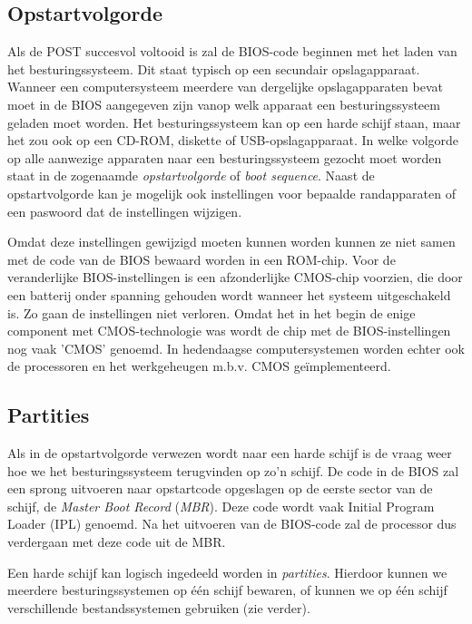 \subsection{Opstartvolgorde}

Als de POST succesvol voltooid is zal de BIOS-code beginnen met
het laden van het besturingssysteem. Dit staat typisch op een
secundair opslagapparaat. Wanneer een computersysteem meerdere van
dergelijke opslagapparaten bevat moet in de BIOS aangegeven zijn vanop
welk apparaat een besturingssysteem geladen moet worden. Het
besturingssysteem kan op een harde schijf staan, maar het zou ook op
een CD-ROM, diskette of USB-opslagapparaat. In welke volgorde op alle
aanwezige apparaten naar een besturingssysteem gezocht moet worden
staat in de zogenaamde \emph{opstartvolgorde} of
\emph{boot sequence}. Naast de opstartvolgorde kan je
mogelijk ook instellingen voor bepaalde randapparaten of een paswoord
dat de instellingen wijzigen.

Omdat deze instellingen gewijzigd moeten kunnen worden kunnen ze
niet samen met de code van de BIOS bewaard worden in een ROM-chip.
Voor de veranderlijke BIOS-instellingen is een afzonderlijke CMOS-chip
voorzien, die door een batterij onder spanning gehouden wordt wanneer
het systeem uitgeschakeld is. Zo gaan de instellingen niet verloren.
Omdat het in het begin de enige component met CMOS-technologie was
wordt de chip met de BIOS-instellingen nog vaak 'CMOS' genoemd. In
hedendaagse computersystemen worden echter ook de processoren en het
werkgeheugen m.b.v. CMOS ge\"implementeerd.

\subsection{Partities}

Als in de opstartvolgorde verwezen wordt naar een harde schijf
is de vraag weer hoe we het besturingssysteem terugvinden op zo'n
schijf. De code in de BIOS zal een sprong uitvoeren naar opstartcode
opgeslagen op de eerste sector van de schijf, de \emph{Master
Boot Record} (\emph{MBR}). Deze code wordt
vaak Initial Program Loader (IPL) genoemd. Na het uitvoeren van de
BIOS-code zal de processor dus verdergaan met deze code uit de
MBR.

Een harde schijf kan logisch ingedeeld worden in
\emph{partities}. Hierdoor kunnen we meerdere
besturingssystemen op \'e\'en schijf bewaren, of kunnen we op \'e\'en schijf
verschillende bestandssystemen gebruiken (zie verder).

